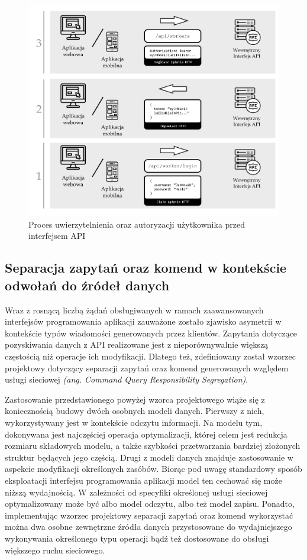 \begin{figure}[ht]
 \centering
  \includegraphics[width=1\linewidth]{rys02/uwierzytelnianie-autoryzacja}
 \caption{Proces uwierzytelnienia oraz autoryzacji użytkownika przed interfejsem API}
 \label{fig:uwierzytelnienie-autoryzacja}
\end{figure}


\subsection*{Separacja zapytań oraz komend w kontekście odwołań do źródeł danych}
Wraz z rosnącą liczbą żądań obsługiwanych w ramach zaawansowanych interfejsów programowania aplikacji zauważone zostało zjawisko asymetrii w kontekście typów wiadomości generowanych przez klientów. Zapytania dotyczące pozyskiwania danych z API realizowane jest z nieporównywalnie większą częstością niż operacje ich modyfikacji. Dlatego też, zdefiniowany został wzorzec projektowy dotyczący separacji zapytań oraz komend generowanych względem usługi sieciowej \textit{(ang. Command Query Responsibility Segregation)}.

Zastosowanie przedstawionego powyżej wzorca projektowego wiąże się z koniecznością budowy dwóch osobnych modeli danych. Pierwszy z nich, wykorzystywany jest w kontekście odczytu informacji. Na modelu tym, dokonywana jest najczęściej operacja optymalizacji, której celem jest redukcja rozmiaru składowych modelu, a także szybkości przetwarzania bardziej złożonych struktur będących jego częścią. Drugi z modeli danych znajduje zastosowanie w aspekcie modyfikacji określonych zasóbów. Biorąc pod uwagę standardowy sposób eksploatacji interfejsu programowania aplikacji model ten cechować się może niższą wydajnością. W zależności od specyfiki określonej usługi sieciowej optymalizowany może być albo model odczytu, albo też model zapisu. Ponadto, implementując wzorzec projektowy separacji zapytań oraz komend wykorzystać można dwa osobne zewnętrzne źródła danych przystosowane do wydajniejszego wykonywania określonego typu operacji bądź też dostosowane do obsługi większego ruchu sieciowego.   

